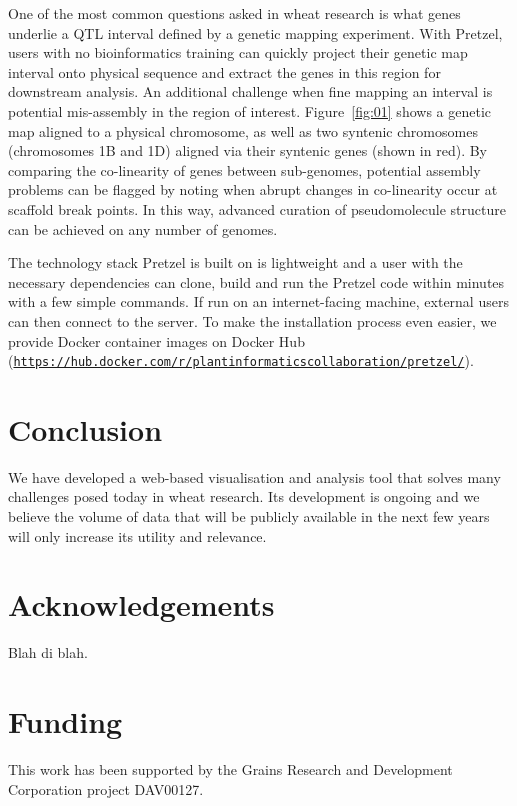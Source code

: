 One of the most common questions asked in wheat research is what genes underlie a QTL interval
  defined by a genetic mapping experiment. 
%
With Pretzel, users with no bioinformatics training can quickly project their genetic map interval
  onto physical sequence and extract the genes in this region for downstream analysis. 
%
An additional challenge when fine mapping an interval is potential mis-assembly in the region
  of interest. Figure~\ref{fig:01} shows a genetic map aligned to a physical chromosome, as well as
  two syntenic chromosomes (chromosomes 1B and 1D) aligned via their syntenic genes (shown in red). 
%
By comparing the co-linearity of genes between sub-genomes, potential assembly problems can be
  flagged by noting when abrupt changes in co-linearity occur at scaffold break points. 
%
In this way, advanced curation of pseudomolecule structure can be achieved on any number of genomes.

The technology stack Pretzel is built on is lightweight and a user with the necessary dependencies
can clone, build and run the Pretzel code within minutes with a few simple commands. 
%
If run on an internet-facing machine, external users can then connect to the server.
%
To make the installation process even easier, we provide Docker container images on Docker Hub
(\href{https://hub.docker.com/r/plantinformaticscollaboration/pretzel/}{\nolinkurl{https://hub.docker.com/r/plantinformaticscollaboration/pretzel/}}).

\section{Conclusion}

We have developed a web-based visualisation and analysis tool that solves many challenges posed today in wheat research. 
%
Its development is ongoing and we believe the volume of data that will be publicly available in the next few years will only increase its utility and relevance.

\section*{Acknowledgements}

Blah di blah.

\section*{Funding}

This work has been supported by the Grains Research and Development Corporation project DAV00127.\vspace*{-12pt}




